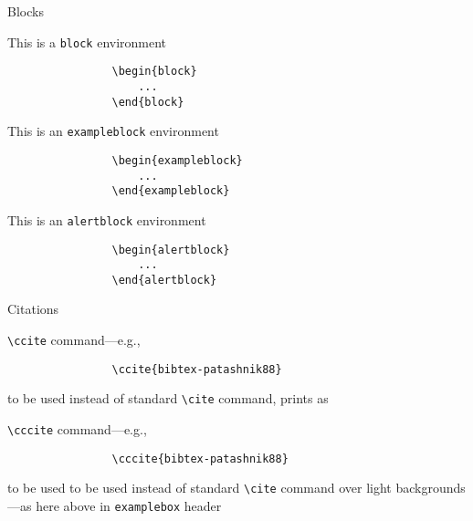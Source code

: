\documentclass[presentation]{beamer}\mode<presentation>{\usetheme{AMSBolognaFC}}
\begin{document}
	\begin{frame}[c,fragile]{Blocks}
		\begin{block}{This is a \texttt{block} environment}
			\begin{verbatim}
				\begin{block}
					...
				\end{block}
			\end{verbatim}
		\end{block}
		\begin{exampleblock}{This is an \texttt{exampleblock} environment}
			\begin{verbatim}
				\begin{exampleblock}
					...
				\end{exampleblock}
			\end{verbatim}
		\end{exampleblock}
		\begin{alertblock}{This is an \texttt{alertblock} environment}
			\begin{verbatim}
				\begin{alertblock}
					...
				\end{alertblock}
			\end{verbatim}
		\end{alertblock}
	\end{frame}
	
	\begin{frame}[c,fragile]{Citations}
		\begin{alertblock}{\texttt{\textbackslash{}ccite} command---e.g., }
			\begin{verbatim}
				\ccite{bibtex-patashnik88}
			\end{verbatim}
			to be used instead of standard \texttt{\textbackslash{}cite} command, prints as 
		\end{alertblock}
		\begin{exampleblock}{\texttt{\textbackslash{}cccite} command---e.g., }
			\begin{verbatim}
				\cccite{bibtex-patashnik88}
			\end{verbatim}
			to be used to be used instead of standard \texttt{\textbackslash{}cite} command over light backgrounds---as here above in \texttt{examplebox} header
		\end{exampleblock}
	\end{frame}
	
\end{document}
